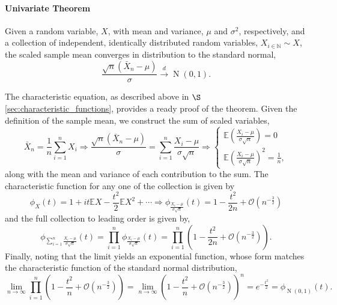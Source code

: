 \documentclass[12pt, twoside, draft]{article}
\begin{document}
\paragraph{Univariate Theorem}\label{sec:univariate_central_limit_theorem}
Given a random variable, $X$, with mean and variance, $\mu$ and $\sigma^2$, respectively, and a collection of independent, identically distributed random variables, $X_{i\in\mathbb{N}} \sim X$, the scaled sample mean converges in distribution to the standard normal,
\begin{equation}
\frac{\sqrt{n} (\bar{X}_n - \mu)}{\sigma} \stackrel{d}{\longrightarrow} \operatorname{N}(0,1).
\end{equation}

The characteristic equation, as described above in $\S$\ref{sec:characteristic_functions}, provides a ready proof of the theorem.  Given the definition of the sample mean, we construct the sum of scaled variables,
\begin{equation}
\bar{X}_n = \frac{1}{n} \sum_{i=1}^n X_i \Rightarrow \frac{\sqrt{n}(\bar{X}_n - \mu)}{\sigma} = \sum_{i=1}^n \frac{X_i - \mu}{\sigma \sqrt{n}}
\Rightarrow \begin{cases}
\mathbb{E}\left( \frac{X_i -\mu}{\sigma \sqrt{n}} \right) = 0 \\
\mathbb{E}\left( \frac{X_i -\mu}{\sigma \sqrt{n}} \right)^2 = \frac{1}{n},
\end{cases}
\end{equation}
along with the mean and variance of each contribution to the sum.  The characteristic function for any one of the collection is given by
\begin{equation}
\phi_{X}(t) = 1 + it\mathbb{E}X - \frac{t^2}{2}\mathbb{E}X^2 + \cdots 
\Rightarrow
\phi_{\frac{X_i - \mu}{\sigma \sqrt{n}}}(t) = 1 - \frac{t^2}{2n} + \mathcal{O} \left( n^{-\frac{3}{2}} \right)
\end{equation}
and the full collection to leading order is given by,
\begin{equation}
\phi_{\sum_{i=1}^n \frac{X_i - \mu}{\sigma \sqrt{n}}}(t) = \prod_{i=1}^n \phi_{\frac{X_i - \mu}{\sigma \sqrt{n}}}(t)  = \prod_{i=1}^n \left( 1 - \frac{t^2}{2n} + \mathcal{O} \left( n^{-\frac{3}{2}} \right) \right).
\end{equation}
Finally, noting that the limit yields an exponential function, whose form matches the characteristic function of the standard normal distribution,
\begin{equation}
\lim_{n\rightarrow\infty} \prod_{i=1}^n \left( 1 - \frac{t^2}{n} + \mathcal{O} \left( n^{-\frac{3}{2}} \right) \right) = \lim_{n\rightarrow\infty} \left( 1 - \frac{t^2}{n} + \mathcal{O} \left( n^{-\frac{3}{2}} \right) \right)^n = e^{-\frac{t^2}{2}} = \phi_{\operatorname{N}(0,1)}(t).
\end{equation}
\end{document}
